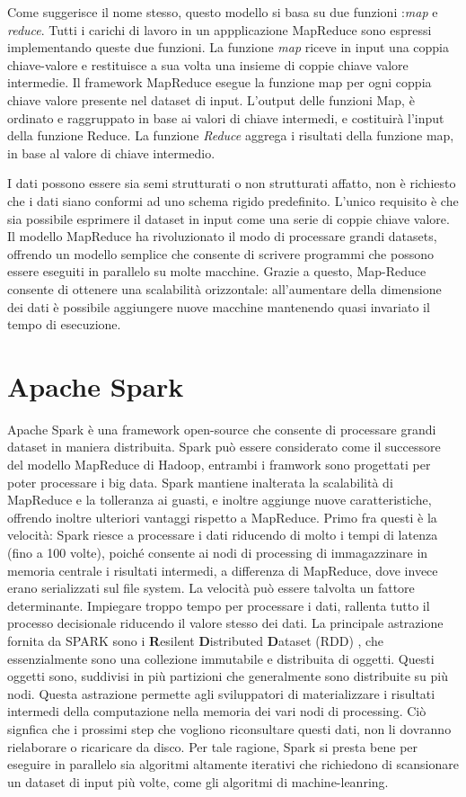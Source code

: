 Come suggerisce il nome stesso, questo modello si basa su due funzioni :\emph{map}   e \emph{reduce}. Tutti i carichi di lavoro in un appplicazione MapReduce sono espressi implementando queste due funzioni.
La funzione \emph{map} riceve in input una coppia chiave-valore e restituisce a sua volta una insieme di  coppie chiave valore intermedie. Il framework MapReduce esegue la funzione map per ogni coppia chiave valore presente nel dataset di input. L'output delle funzioni Map, è ordinato e raggruppato in base ai valori di chiave intermedi, e costituirà l'input della funzione Reduce. La funzione \emph{Reduce} aggrega i risultati della funzione map, in base al valore di chiave intermedio.

I dati possono essere sia semi strutturati o non strutturati affatto, non è richiesto che i dati siano conformi ad uno schema rigido predefinito. L'unico requisito è che sia possibile esprimere il dataset in input come una serie di coppie chiave valore.
Il modello MapReduce ha rivoluzionato il modo di processare grandi datasets, offrendo un modello semplice che consente di scrivere programmi che possono essere eseguiti in parallelo su molte macchine. Grazie a questo, Map-Reduce consente di ottenere una scalabilità orizzontale: all'aumentare della dimensione dei dati è possibile aggiungere nuove macchine mantenendo quasi invariato il tempo di esecuzione.
\section{Apache Spark}
Apache Spark \cite{Zaharia:2010:SCC:1863103.1863113} è una framework open-source che consente di processare grandi dataset in maniera distribuita.
Spark può essere considerato come il successore del modello MapReduce di Hadoop, entrambi i framwork sono progettati per poter processare i big data.  Spark mantiene inalterata la scalabilità di MapReduce e la tolleranza ai guasti, e inoltre aggiunge nuove caratteristiche, offrendo inoltre ulteriori vantaggi rispetto a MapReduce. Primo fra questi è la velocità: Spark riesce a processare i dati riducendo  di molto i tempi di latenza (fino a 100 volte), poiché  consente ai nodi di processing di immagazzinare in memoria centrale i risultati intermedi, a differenza di MapReduce, dove invece erano serializzati sul file system.  La velocità può essere talvolta un fattore determinante. Impiegare troppo tempo per processare i dati, rallenta tutto il processo decisionale riducendo il valore stesso dei dati.
La principale astrazione fornita da SPARK sono i \textbf{R}esilent \textbf{D}istributed \textbf{D}ataset (RDD) \cite{Zaharia:2012:RDD:2228298.2228301}, che essenzialmente sono una collezione immutabile e distribuita di oggetti. Questi oggetti sono, suddivisi in più partizioni che  generalmente sono distribuite su più nodi.
Questa astrazione permette agli sviluppatori di materializzare i risultati intermedi della computazione  nella memoria dei vari nodi di processing. Ciò signfica che i prossimi step che vogliono riconsultare questi dati, non li dovranno rielaborare o ricaricare da disco.
Per tale ragione, Spark si presta bene per eseguire in parallelo sia algoritmi altamente iterativi che richiedono di scansionare un dataset di input più volte, come gli algoritmi di machine-leanring.

